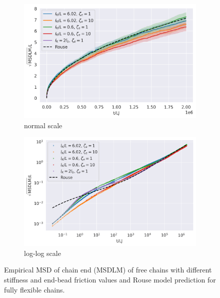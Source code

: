 \documentclass[
    paper=A4,pagesize=automedia,fontsize=12pt,
    BCOR=15mm,DIV=22,
    twoside,headinclude,footinclude=false,
    fleqn,             %
    bibliography=totocnumbered,          %
    listof=totoc,                %
    listof=flat,                 %
    cleardoublepage=empty      %
    numbers=endperiod
]{scrartcl}
\begin{document}
\begin{figure}
    \centering
    \begin{subfigure}[b]{\textwidth}
        \centering
        \includegraphics[width=\textwidth]{17+18+19+20-exp-msd.png}
        \caption{normal scale}
        \label{fig:msd_free-normal}
    \end{subfigure}
    \begin{subfigure}[b]{\textwidth}
        \centering
        \includegraphics[width=\textwidth]{17+18+19+20-exp-msd-log.png}
        \caption{log-log scale}
        \label{fig:msd_free-log}
    \end{subfigure}
    \caption{
        Empirical MSD of chain end (MSDLM) of free chains
        with different stiffness and end-bead friction values and
        Rouse model prediction for fully flexible chains.
    }
    \label{fig:msd_free}
\end{figure}
\end{document}
